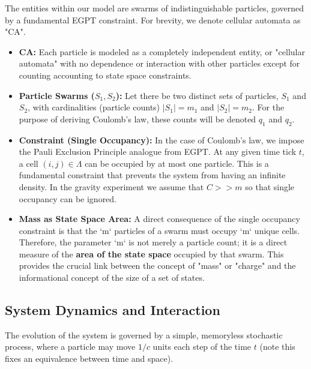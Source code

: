 \documentclass[11pt, letterpaper]{article}
\begin{document}
The entities within our model are swarms of indistinguishable particles, governed by a fundamental EGPT constraint. For brevity, we denote cellular automata as "CA".

\begin{itemize}
    \item \textbf{CA:} Each particle is modeled as a completely independent entity, or "cellular automata" with no dependence or interaction with other particles except for counting accounting to state space constraints.

    \item \textbf{Particle Swarms ($S_1, S_2$):} Let there be two distinct sets of particles, $S_1$ and $S_2$, with cardinalities (particle counts) $|S_1| = m_1$ and $|S_2| = m_2$. For the purpose of deriving Coulomb's law, these counts will be denoted $q_1$ and $q_2$.

    \item \textbf{Constraint (Single Occupancy):} In the case of Coulomb's law, we impose the Pauli Exclusion Principle analogue from EGPT. At any given time tick $t$, a cell $(i,j) \in \Lambda$ can be occupied by at most one particle. This is a fundamental constraint that prevents the system from having an infinite density. In the gravity experiment we assume that $C >> m$ so that single occupancy can be ignored.

    \item \textbf{Mass as State Space Area:} A direct consequence of the single occupancy constraint is that the `m` particles of a swarm must occupy `m` unique cells. Therefore, the parameter `m` is not merely a particle count; it is a direct measure of the \textbf{area of the state space} occupied by that swarm. This provides the crucial link between the concept of "mass" or "charge" and the informational concept of the size of a set of states.
\end{itemize}

\subsection{System Dynamics and Interaction}

The evolution of the system is governed by a simple, memoryless stochastic process, where a particle may move $1/c$ units each step of the time $t$ (note this fixes an equivalence between time and space).
\end{document}
